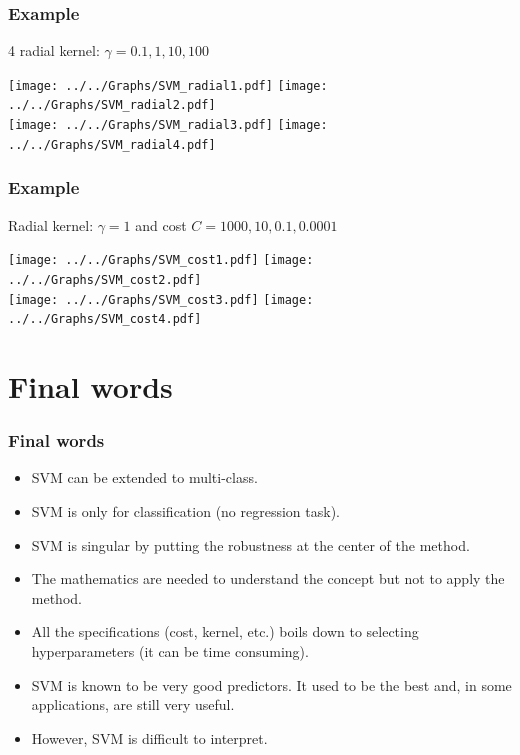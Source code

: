 \begin{frame}
\frametitle{Example}
\scriptsize
4 radial kernel: $\gamma=0.1, 1, 10, 100$ 
\normalsize
\begin{center}
\texttt{[image: ../../Graphs/SVM\_radial1.pdf]} 
\texttt{[image: ../../Graphs/SVM\_radial2.pdf]} \\
\texttt{[image: ../../Graphs/SVM\_radial3.pdf]} 
\texttt{[image: ../../Graphs/SVM\_radial4.pdf]} 
\end{center}
\end{frame}
\begin{frame}
\frametitle{Example}
\scriptsize
Radial kernel: $\gamma=1$ and cost $C=1000, 10, 0.1, 0.0001$ 
\normalsize
\begin{center}
\texttt{[image: ../../Graphs/SVM\_cost1.pdf]} 
\texttt{[image: ../../Graphs/SVM\_cost2.pdf]} \\
\texttt{[image: ../../Graphs/SVM\_cost3.pdf]} 
\texttt{[image: ../../Graphs/SVM\_cost4.pdf]} 
\end{center}
\end{frame}
\section{Final words}
\begin{frame}
\frametitle{Final words}
\begin{itemize}
\item SVM can be extended to multi-class.
\item SVM is only for classification (no regression task).
\item SVM is singular by putting the robustness at the center of the method.
\item The mathematics are needed to understand the concept but not to apply the method.
\item All the specifications (cost, kernel, etc.) boils down to selecting hyperparameters (it can be time consuming).
\item SVM is known to be very good predictors. It used to be the best and, in some applications, are still very useful. 
\item However, SVM is difficult to interpret.
\end{itemize}
\end{frame}


